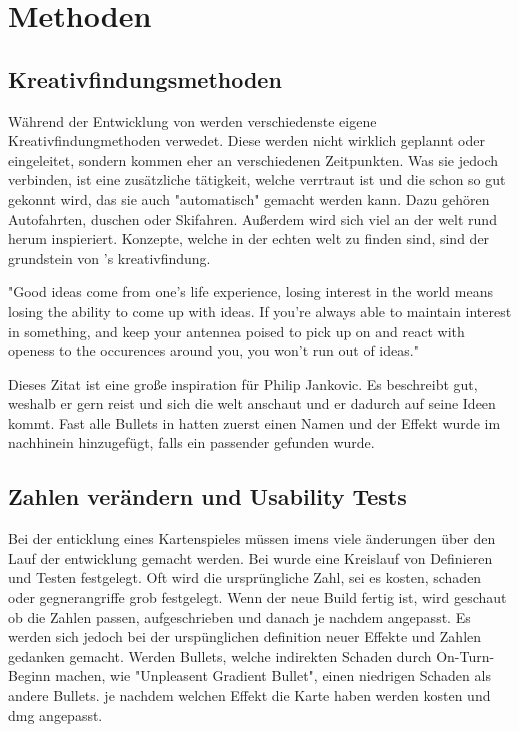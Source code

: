 
\section{Methoden}\label{sec:methoden}

\renewcommand{\kapitelautor}{Autor: Philip Jankovic}

%

\subsection{Kreativfindungsmethoden}\label{subsec:kreativfindungsmethoden}

Während der Entwicklung von \FF werden verschiedenste eigene Kreativfindungmethoden verwedet. Diese werden nicht wirklich
geplannt oder eingeleitet, sondern kommen eher an verschiedenen Zeitpunkten. Was sie jedoch verbinden, ist eine zusätzliche
tätigkeit, welche verrtraut ist und die schon so gut gekonnt wird, das sie auch "automatisch" gemacht werden kann.
Dazu gehören \zB Autofahrten, duschen oder Skifahren. Außerdem wird sich viel an der welt rund herum inspieriert.
Konzepte, welche in der echten welt zu finden sind, sind der grundstein von \FF's kreativfindung.

"Good ideas come from one's life experience, losing interest in the world means losing the ability to come up with ideas.
If you're always able to maintain interest in something, and keep your antennea poised to pick up on and react with openess
to the occurences around you, you won't run out of ideas."%


Dieses Zitat ist eine große inspiration für Philip Jankovic. Es beschreibt gut, weshalb er gern reist und sich die welt
anschaut und er dadurch auf seine Ideen kommt. Fast alle Bullets in \FF hatten zuerst einen Namen und der Effekt wurde
im nachhinein hinzugefügt, falls ein passender gefunden wurde.


\subsection{Zahlen verändern und Usability Tests}\label{subsec:usability}

Bei der enticklung eines Kartenspieles müssen imens viele änderungen über den Lauf der entwicklung gemacht werden.
Bei \FF wurde eine Kreislauf von Definieren und Testen festgelegt. Oft wird die ursprüngliche Zahl, sei es kosten,
schaden oder gegnerangriffe grob festgelegt. Wenn der neue Build fertig ist, wird geschaut ob die Zahlen passen, aufgeschrieben und danach
je nachdem angepasst. Es werden sich jedoch bei der urspünglichen definition neuer Effekte und Zahlen gedanken gemacht.
\zB Werden Bullets, welche indirekten Schaden durch \zB On-Turn-Beginn machen, wie "Unpleasent Gradient Bullet", einen niedrigen Schaden als andere Bullets.
je nachdem welchen Effekt die Karte haben werden kosten und dmg angepasst.




%

\renewcommand{\kapitelautor}{}
